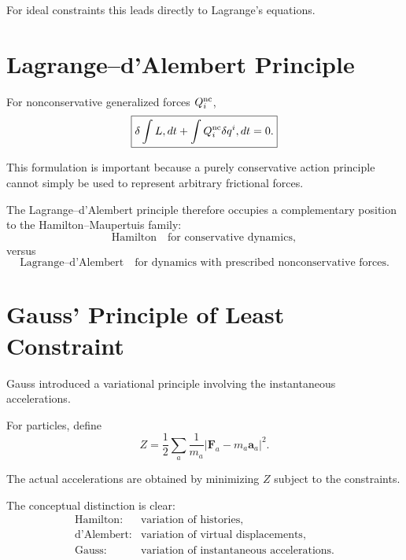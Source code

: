 For ideal constraints this leads directly to Lagrange's equations.

\section{Lagrange--d'Alembert Principle}

For nonconservative generalized forces $Q_i^{\rm nc}$,
\begin{equation}
\boxed{
\delta\int L,dt
+
\int Q_i^{\rm nc}\delta q^i,dt
=
0.
}
\end{equation}

This formulation is important because a purely conservative action principle cannot simply be used to represent arbitrary frictional forces.

The Lagrange--d'Alembert principle therefore occupies a complementary position to the Hamilton--Maupertuis family:
\begin{equation}
\text{Hamilton}
\quad\text{for conservative dynamics},
\end{equation}
versus
\begin{equation}
\text{Lagrange--d'Alembert}
\quad\text{for dynamics with prescribed nonconservative forces}.
\end{equation}

\section{Gauss' Principle of Least Constraint}

Gauss introduced a variational principle involving the instantaneous accelerations.

For particles, define
\begin{equation}
Z=
\frac12
\sum_a
\frac1{m_a}
\left|
\mathbf F_a-m_a\mathbf a_a
\right|^2.
\end{equation}

The actual accelerations are obtained by minimizing $Z$ subject to the constraints.

The conceptual distinction is clear:
\begin{equation}
\boxed{
\begin{array}{ll}
\text{Hamilton:}&
\text{variation of histories},\\
\text{d'Alembert:}&
\text{variation of virtual displacements},\\
\text{Gauss:}&
\text{variation of instantaneous accelerations}.
\end{array}}
\end{equation}

